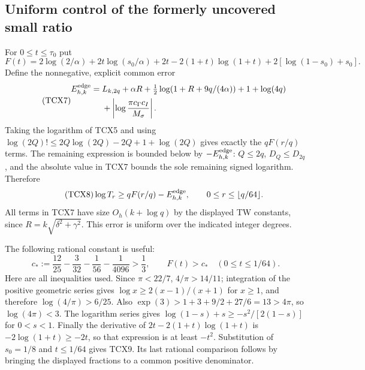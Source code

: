 \documentclass[11pt,a4paper]{article}
\begin{document}
\subsection{Uniform control of the formerly uncovered small ratio}

For $0\le t\le\tau_0$ put
\begin{equation}\tag{TCX6}
 F(t)=2\log(2/\alpha)+2t\log(s_0/\alpha)
       +2t-2(1+t)\log(1+t)
       +2[\log(1-s_0)+s_0].
\end{equation}
Define the nonnegative, explicit common error
\begin{equation}\tag{TCX7}
\begin{aligned}
 E_{h,k}^{\rm edge}={}&L_{k,2q}+\alpha R
 +\tfrac12\log(1+R+9q/(4\alpha))+1+\log(4q)\\
 &+\left|\log\frac{\pi c_\Gamma c_I}{M_\sigma}\right|.
\end{aligned}
\end{equation}
Taking the logarithm of TCX5 and using
$\log(2Q)!\le2Q\log(2Q)-2Q+1+\log(2Q)$ gives exactly
the $qF(r/q)$ terms. The remaining expression is bounded below by
$-E_{h,k}^{\rm edge}$: $Q\le2q$, $D_Q\le D_{2q}$, and the
absolute value in TCX7 bounds the sole remaining signed logarithm.
Therefore
\begin{equation}\tag{TCX8}
 \log T_r\ge qF(r/q)-E_{h,k}^{\rm edge},
 \qquad 0\le r\le\lfloor q/64\rfloor.
\end{equation}
All terms in TCX7 have size $O_h(k+\log q)$ by the displayed TW
constants, since $R=k\sqrt{\delta^2+\gamma^2}$. This error is uniform
over the indicated integer degrees.

The following rational constant is useful:
\begin{equation}\tag{TCX9}
 c_*:=\frac{12}{25}-\frac3{32}-\frac1{56}-\frac1{4096}
             >\frac13,\qquad F(t)>c_*\quad(0\le t\le1/64).
\end{equation}
Here are all inequalities used. Since $\pi<22/7$,
$4/\pi>14/11$; integration of the positive geometric series gives
$\log x\ge2(x-1)/(x+1)$ for $x\ge1$, and therefore
$\log(4/\pi)>6/25$. Also
$\exp(3)>1+3+9/2+27/6=13>4\pi$, so $\log(4\pi)<3$.
The logarithm series gives
$\log(1-s)+s\ge-s^2/[2(1-s)]$ for $0<s<1$.
Finally the derivative of
$2t-2(1+t)\log(1+t)$ is $-2\log(1+t)\ge-2t$, so that
expression is at least $-t^2$. Substitution of $s_0=1/8$ and
$t\le1/64$ gives TCX9. Its last rational comparison follows by
bringing the displayed fractions to a common positive denominator.
\end{document}
